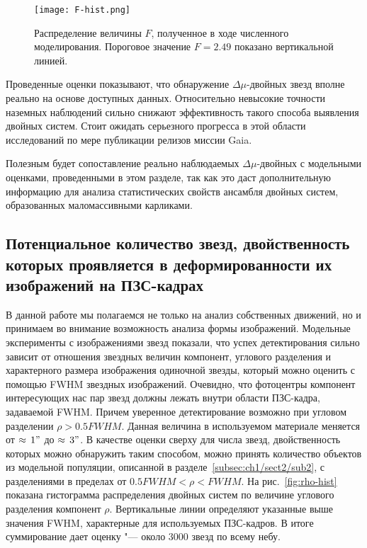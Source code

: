 \begin{figure}[pt]\label{fig:F-hist}
\centering
\texttt{[image: F-hist.png]}
\caption{Распределение величины $F$, полученное в ходе численного моделирования. Пороговое значение $F=2.49$ показано вертикальной линией. }
\end{figure}

Проведенные оценки показывают, что обнаружение $\Delta\mu$-двойных звезд вполне реально на основе доступных данных. Относительно невысокие точности наземных наблюдений сильно  снижают эффективность такого способа выявления двойных систем. Стоит ожидать серьезного прогресса в этой области исследований по мере публикации релизов миссии Gaia.

Полезным будет сопоставление реально наблюдаемых  $\Delta\mu$-двойных с модельными оценками, проведенными в этом разделе, так как это даст дополнительную информацию для анализа статистических свойств ансамбля двойных систем, образованных маломассивными карликами.

\subsection{Потенциальное количество звезд, двойственность которых проявляется в деформированности их изображений на ПЗС-кадрах}\label{subsec:ch1/sect3/sub3}

В данной работе мы полагаемся не только на анализ собственных движений, но и принимаем во внимание возможность анализа формы изображений.  Модельные эксперименты с изображениями звезд показали, что успех детектирования сильно зависит от отношения звездных величин компонент, углового разделения и характерного размера изображения одиночной звезды, который можно оценить с помощью FWHM звездных изображений. Очевидно, что фотоцентры компонент интересующих нас пар звезд должны лежать внутри области ПЗС-кадра, задаваемой FWHM. Причем уверенное детектирование возможно при угловом разделении $\rho>0.5FWHM$.  Данная величина в используемом материале меняется от $\approx\,1"$ до $\approx\,3"$.  В качестве оценки сверху для числа звезд, двойственность которых можно обнаружить таким способом, можно принять количество объектов из модельной популяции, описанной в разделе~\ref{subsec:ch1/sect2/sub2}, с разделениями в пределах от $0.5FWHM<\rho<FWHM$. На рис.~\ref{fig:rho-hist} показана гистограмма распределения двойных систем по величине углового разделения компонент $\rho$. Вертикальные линии определяют указанные выше значения FWHM, характерные для используемых ПЗС-кадров. В итоге суммирование дает оценку "--- около 3000 звезд по всему небу.  

